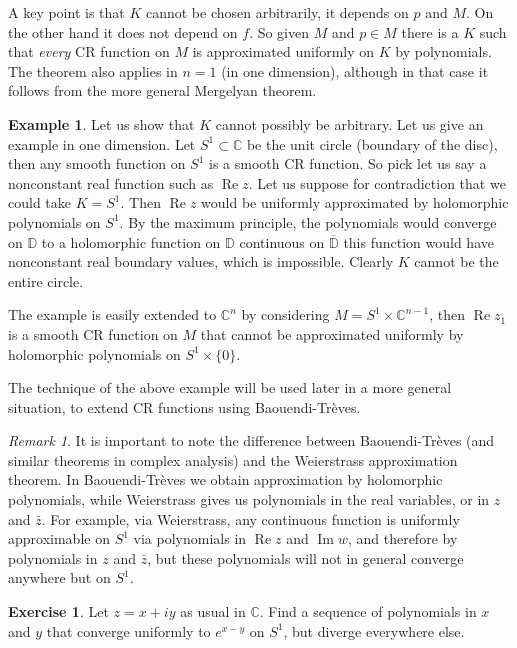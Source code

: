 \documentclass[12pt,openany]{book}
\renewcommand{\Re}{\operatorname{Re}}
\renewcommand{\Im}{\operatorname{Im}}
\newcommand{\C}{{\mathbb{C}}}
\newcommand{\D}{{\mathbb{D}}}
\theoremstyle{plain}
\theoremstyle{remark}
\newtheorem{remark}[thm]{Remark}
\theoremstyle{definition}
\newenvironment{exbox}{%
    \def\FrameCommand{\vrule width 1pt \relax\hspace {10pt}}%
    \MakeFramed {\advance \hsize -\width \FrameRestore }%
}{%
    \endMakeFramed
}
\theoremstyle{exercise}
\newtheorem{exercise}{Exercise}[section]
\theoremstyle{example}
\newtheorem{example}[thm]{Example}
\begin{document}
A key point is that $K$ cannot be chosen arbitrarily, it depends on $p$ and $M$.
On the other hand it does not depend on $f$.  So given $M$ and $p \in M$
there is a $K$ such that \emph{every} CR function on $M$ is approximated
uniformly on $K$ by polynomials.  The theorem also applies in $n=1$ (in one
dimension), although in that case it follows from the more general Mergelyan
theorem.

\begin{example}
Let us show that $K$ cannot possibly be arbitrary.  Let us give an example
in one dimension.  Let $S^1 \subset \C$ be the unit circle (boundary of the disc),
then any smooth function on $S^1$ is a smooth CR function.  So pick let us
say a nonconstant real function such as $\Re z$.  Let us suppose for
contradiction that we could take $K = S^1$.  Then $\Re z$ would be uniformly
approximated by holomorphic polynomials on $S^1$.  By the maximum principle, the
polynomials would converge on $\D$ to a holomorphic function on $\D$
continuous on $\overline{\D}$ this function would have nonconstant real boundary values,
which is impossible.  Clearly $K$ cannot be the entire circle.

The example is easily extended to $\C^n$
by considering 
$M = S^1 \times \C^{n-1}$, then $\Re z_1$ is a smooth CR function on $M$ that cannot be
approximated uniformly by holomorphic polynomials on $S^1 \times \{ 0 \}$.
\end{example}

The technique of the above example will be used later in a more general
situation, to extend CR functions using Baouendi-Tr{\`e}ves.

\begin{remark}
It is important to note the difference
between Baouendi-Tr{\`e}ves (and similar theorems
in complex analysis)
and the Weierstrass approximation theorem.  In Baouendi-Tr{\`e}ves we obtain
approximation by holomorphic polynomials, while Weierstrass gives us
polynomials in the real variables, or in $z$ and $\bar{z}$.  For example,
via Weierstrass, any continuous function is uniformly approximable on $S^1$ via polynomials
in $\Re z$ and $\Im w$, and therefore by polynomials in $z$ and $\bar{z}$,
but these polynomials will not in general converge anywhere but on $S^1$.
\end{remark}

\begin{exbox}
\begin{exercise}
Let $z=x+iy$ as usual in $\C$.
Find a sequence of polynomials in $x$ and $y$ that converge uniformly to $e^{x-y}$ on $S^1$,
but diverge everywhere else.
\end{exercise}
\end{exbox}
\end{document}
